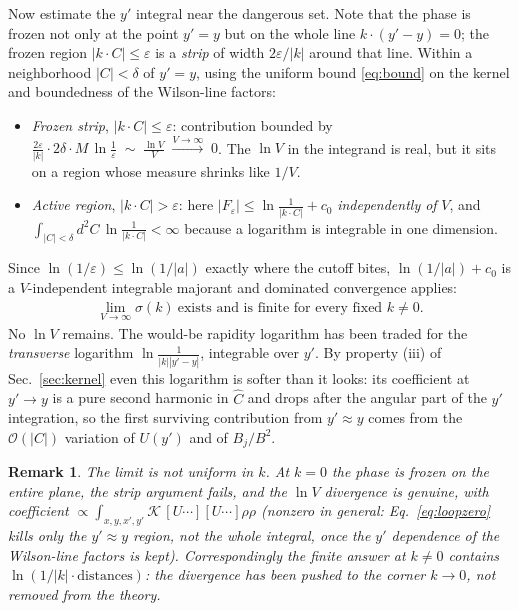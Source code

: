 \documentclass[11pt]{article}
\newtheorem{remark}{Remark}
\newcommand{\bB}{B}
\newcommand{\bC}{C}
\newcommand{\Chat}{\hat C}
\begin{document}
Now estimate the $y'$ integral near the dangerous set.  Note that the
phase is frozen not only at the point $y'=y$ but on the whole line
$k\cdot(y'-y)=0$; the frozen region $|k\cdot\bC|\le\varepsilon$ is a
\emph{strip} of width $2\varepsilon/|k|$ around that line.  Within a
neighborhood $|\bC|<\delta$ of $y'=y$, using the uniform bound
\eqref{eq:bound} on the kernel and boundedness of the Wilson-line
factors:
\begin{itemize}
\item[\emph{(a)}] \emph{Frozen strip}, $|k\cdot\bC|\le\varepsilon$:
contribution bounded by
$\frac{2\varepsilon}{|k|}\cdot2\delta\cdot
M\,\ln\frac1\varepsilon\;\sim\;\frac{\ln V}{V}\;\xrightarrow{V\to\infty}\;0$.
The $\ln V$ in the integrand is real, but it sits on a region whose
measure shrinks like $1/V$.
\item[\emph{(b)}] \emph{Active region}, $|k\cdot\bC|>\varepsilon$: here
$|F_\varepsilon|\le\ln\frac{1}{|k\cdot\bC|}+c_0$ \emph{independently of}
$V$, and $\int_{|\bC|<\delta}d^2\bC\,\ln\frac{1}{|k\cdot\bC|}<\infty$
because a logarithm is integrable in one dimension.
\end{itemize}
Since $\ln(1/\varepsilon)\le\ln(1/|a|)$ exactly where the cutoff bites,
$\ln(1/|a|)+c_0$ is a $V$-independent integrable majorant and dominated
convergence applies:
\begin{align}
\boxed{\;\lim_{V\to\infty}\sigma(k)\ \text{exists and is finite for
every fixed } k\neq0 .\;}
\end{align}
No $\ln V$ remains.  The would-be rapidity logarithm has been traded for
the \emph{transverse} logarithm $\ln\frac{1}{|k||y'-y|}$, integrable
over $y'$.  By property (iii) of Sec.~\ref{sec:kernel} even this
logarithm is softer than it looks: its coefficient at $y'\to y$ is a
pure second harmonic in $\Chat$ and drops after the angular part of the
$y'$ integration, so the first surviving contribution from $y'\approx y$
comes from the $\mathcal O(|\bC|)$ variation of $U(y')$ and of
$\bB_j/\bB^2$.

\begin{remark}
The limit is not uniform in $k$.  At $k=0$ the phase is frozen on the
entire plane, the strip argument fails, and the $\ln V$ divergence is
genuine, with coefficient
$\propto\int_{x,y,x',y'}\mathcal K\,[U\cdots][U\cdots]\rho\rho$
(nonzero in general: Eq.~\eqref{eq:loopzero} kills only the
$y'\approx y$ region, not the whole integral, once the $y'$ dependence
of the Wilson-line factors is kept).  Correspondingly the finite answer
at $k\neq0$ contains $\ln(1/|k|\cdot\text{distances})$: the divergence
has been pushed to the corner $k\to0$, not removed from the theory.
\end{remark}
\end{document}
